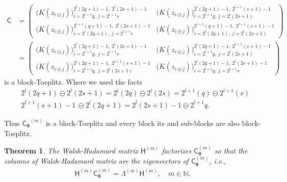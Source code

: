 \documentclass{iitthesis}          %
\newcommand{\bm}[1]{\boldsymbol{#1}}
\newcommand{\naturals}{\mathbb{N}}
\newcommand{\vtheta}{{\bm{\theta}}}
\newcommand{\mC}{\mathsf{C}}
\newcommand{\mH}{\mathsf{H}}
\newcommand{\mCtheta}{{\mathsf{C}_{\vtheta}}}
\newcommand{\mLambda}{\mathsf{\Lambda}}
\newcommand{\ia}{2^{l+1}q}
\newcommand{\ib}{2^{l}(2q+1)-1}
\newcommand{\ic}{2^{l}(2q+1)}
\newcommand{\id}{2^{l+1}(q+1)-1}
\newcommand{\ja}{2^{l+1}s}
\newcommand{\jb}{2^{l}(2s+1)-1}
\newcommand{\jc}{2^{l}(2s+1)}
\newcommand{\jd}{2^{l+1}(s+1)-1}
\newtheorem{theorem}{Theorem}[section]
\begin{document}
\begin{itemize}
\begin{align*}
\mC &=
\begin{pmatrix}
\bigl( K(z_{i \ominus j})\bigr)_{i=\ia, \; j=\ja }^{\ib, \; \jb} & \bigl( K(z_{i \ominus j})\bigr)_{i=\ia, \; j=\jc }^{\ib, \; \jd} \\
\bigl( K(z_{i \ominus j})\bigr)_{i=\ic, \; j=\ja }^{\id, \; \jb} & \bigl( K(z_{i \ominus j})\bigr)_{i=\ic, \; j=\jc }^{\id, \; \jd}
\end{pmatrix} \\
& =
\begin{pmatrix}
\bigl( K(z_{i \ominus j})\bigr)_{i=\ia, \; j=\ja }^{\ib, \; \jb} & \bigl( K(z_{i \ominus j})\bigr)_{i=\ia, \; j=\jc }^{\ib, \; \jd} \\
\bigl( K(z_{i \ominus j})\bigr)_{i=\ia, \; j=\jc }^{\ib, \; \jd} & \bigl( K(z_{i \ominus j})\bigr)_{i=\ia, \; j=\ja }^{\ib, \; \jb}
\end{pmatrix}
\end{align*}
is a block-Toeplitz. Where we used the facts
\begin{align*}
& 2^{l}(2q+1) \ominus 2^{l}(2s+1) = 2^{l}(2q) \ominus 2^{l}(2s) = 2^{l+1}(q) \ominus 2^{l+1}(s) \\
&2^{l+1}(s+1)-1 \, \ominus 2^{l}(2q + 1) %
 = 2^{l}(2s+1)-1 \ominus 2^{l+1}q.
\end{align*}

Thus $\mCtheta^{(m)}$ is a block-Toeplitz and every block its and sub-blocks are also block-Toeplitz.


\end{itemize}
\fi


\begin{theorem}
\label{thrm:hadamard_eigenvector}
The Walsh-Hadamard matrix $\mH^{(m)}$ factorizes $\mC_{\vtheta}^{(m)}$ so that the columns of Walsh-Hadamard matrix are the eigenvectors of $\mC_{\vtheta}^{(m)}$, i.e.,
\begin{align*}
\mH^{(m)} \mC_{\vtheta}^{(m)}  = \mLambda^{(m)} \mH^{(m)}, \quad m \in \naturals. 
\end{align*}
\end{theorem}
\end{document}
